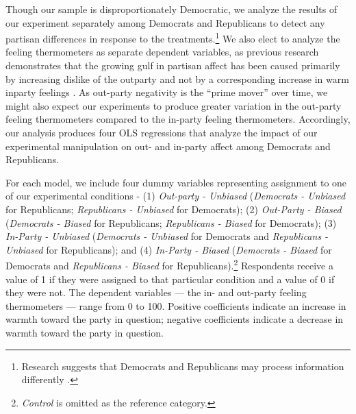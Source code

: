 \documentclass[12pt, letterpaper]{article}
\begin{document}
Though our sample is disproportionately Democratic, we analyze the results of our experiment separately among Democrats and Republicans to detect any partisan differences in response to the treatments.\footnote{Research suggests that Democrats and Republicans may process information differently \citep{grossmanhopkins_2016}.} We also elect to analyze the feeling thermometers as separate dependent variables, as previous research demonstrates that the growing gulf in partisan affect has been caused primarily by increasing dislike of the outparty and not by a corresponding increase in warm inparty feelings \citep{haidthetherington_2012, IyengarSoodLelkes2012}. As out-party negativity is the ``prime mover'' over time, we might also expect our experiments to produce greater variation in the out-party feeling thermometers compared to the in-party feeling thermometers. Accordingly, our analysis produces four OLS regressions that analyze the impact of our experimental manipulation on out- and in-party affect among Democrats and Republicans. 

For each model, we include four dummy variables representing assignment to one of our experimental conditions - (1) \textit{Out-party - Unbiased} (\textit{Democrats - Unbiased} for Republicans; \textit{Republicans - Unbiased} for Democrats); (2) \textit{Out-Party - Biased} (\textit{Democrats - Biased} for Republicans; \textit{Republicans - Biased} for Democrats); (3) \textit{In-Party - Unbiased} (\textit{Democrats - Unbiased} for Democrats and \textit{Republicans - Unbiased} for Republicans); and (4) \textit{In-Party - Biased} (\textit{Democrats - Biased} for Democrats and \textit{Republicans - Biased} for Republicans).\footnote{\textit{Control} is omitted as the reference category.} Respondents receive a value of 1 if they were assigned to that particular condition and a value of 0 if they were not. The dependent variables --- the in- and out-party feeling thermometers --- range from 0 to 100. Positive coefficients indicate an increase in warmth toward the party in question; negative coefficients indicate a decrease in warmth toward the party in question.
\end{document}
